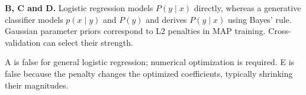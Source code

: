 \textbf{B, C and D.} Logistic regression models \(P(y\mid x)\) directly, whereas a generative classifier models \(p(x\mid y)\) and \(P(y)\) and derives \(P(y\mid x)\) using Bayes' rule. Gaussian parameter priors correspond to L2 penalties in MAP training. Cross-validation can select their strength.


A is false for general logistic regression; numerical optimization is required. E is false because the penalty changes the optimized coefficients, typically shrinking their magnitudes.
